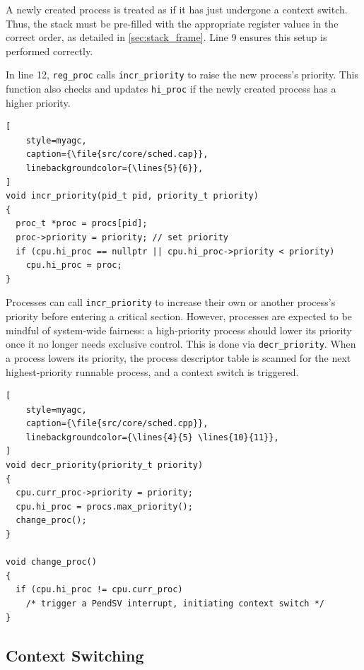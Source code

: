 \begin{emptythm}
    A newly created process is treated as if it has just undergone a context switch.
    Thus, the stack must be pre-filled with the appropriate register values in the
    correct order, as detailed in \autoref{sec:stack_frame}. Line 9 ensures this setup
    is performed correctly.
\end{emptythm}

In line 12, \lstinline[style=myagc]|reg_proc| calls
\lstinline[style=myagc]|incr_priority| to raise the new process’s priority. This
function also checks and updates \lstinline[style=myagc]|hi_proc| if the newly created
process has a higher priority.

\begin{lstlisting}[
    style=myagc,
    caption={\file{src/core/sched.cap}},
    linebackgroundcolor={\lines{5}{6}},
]
void incr_priority(pid_t pid, priority_t priority)
{
  proc_t *proc = procs[pid];
  proc->priority = priority; // set priority
  if (cpu.hi_proc == nullptr || cpu.hi_proc->priority < priority)
    cpu.hi_proc = proc;
}
\end{lstlisting}

Processes can call \lstinline[style=myagc]|incr_priority| to increase their own or
another process’s priority before entering a critical section. However, processes are
expected to be mindful of system-wide fairness: a high-priority process should lower its
priority once it no longer needs exclusive control. This is done via
\lstinline[style=myagc]|decr_priority|. When a process lowers its priority, the process
descriptor table is scanned for the next highest-priority runnable process, and a
context switch is triggered.

\begin{lstlisting}[
    style=myagc,
    caption={\file{src/core/sched.cpp}},
    linebackgroundcolor={\lines{4}{5} \lines{10}{11}},
]
void decr_priority(priority_t priority)
{
  cpu.curr_proc->priority = priority;
  cpu.hi_proc = procs.max_priority();
  change_proc();
}

void change_proc()
{
  if (cpu.hi_proc != cpu.curr_proc)
    /* trigger a PendSV interrupt, initiating context switch */
}
\end{lstlisting}


\subsection{Context Switching}
\label{sec:stack_frame}

